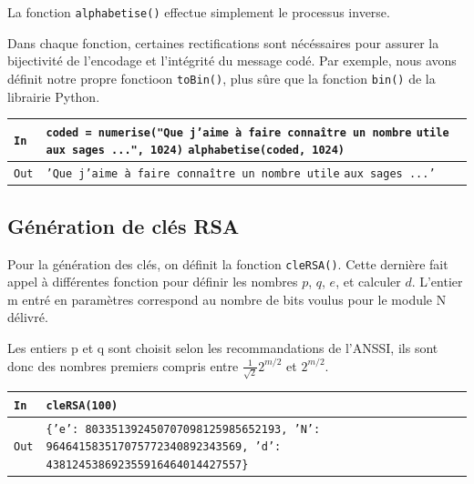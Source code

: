 \documentclass[titlepage]{article}
\begin{document}
    

    La fonction \texttt{alphabetise()} effectue simplement le processus inverse.
    
    

    Dans chaque fonction, certaines rectifications sont nécéssaires pour assurer la bijectivité de l'encodage et l'intégrité du message codé. Par exemple, nous avons définit notre propre fonctioon \texttt{toBin()}, plus sûre que la fonction \texttt{bin()} de la librairie Python. 

    

    \begin{tabularx}{12cm}{|p{0.60cm}|X|}
        \hline
        \rowcolor{gray} \texttt{In} & \texttt{coded = numerise("Que j’aime à faire connaître un nombre} \newline
        \texttt{utile aux sages ...", 1024)} \newline
        \texttt{alphabetise(coded, 1024)} \\
        \hline
        \texttt{Out} & \texttt{'Que j’aime à faire connaître un nombre utile} \newline
        \texttt{aux sages ...'} \\
        \hline
    \end{tabularx}
    \bigbreak

    \subsection{Génération de clés RSA}
    Pour la génération des clés, on définit la fonction \texttt{cleRSA()}. Cette dernière fait appel à différentes fonction pour définir les nombres $p$, $q$, $e$, et calculer $d$.
    L'entier m entré en paramètres correspond au nombre de bits voulus pour le module N délivré.

    Les entiers p et q sont choisit selon les recommandations de l'ANSSI, ils sont donc des nombres premiers compris entre $\frac{1}{\sqrt{2}}2^{m/2}$ et $2^{m/2}$.

    
    

    \begin{tabularx}{12cm}{|p{0.60cm}|X|}
        \hline
        \rowcolor{gray}
        \texttt{In}
        & 
        \texttt{cleRSA(100)}
        \\
        \hline
        \texttt{Out}
        &
        \texttt{\{'e': 803351392450707098125985652193,\newline
        'N': 964641583517075772340892343569,\newline
        'd': 438124538692355916464014427557\}}
        \\
        \hline
    \end{tabularx}
    \bigbreak
\end{document}
